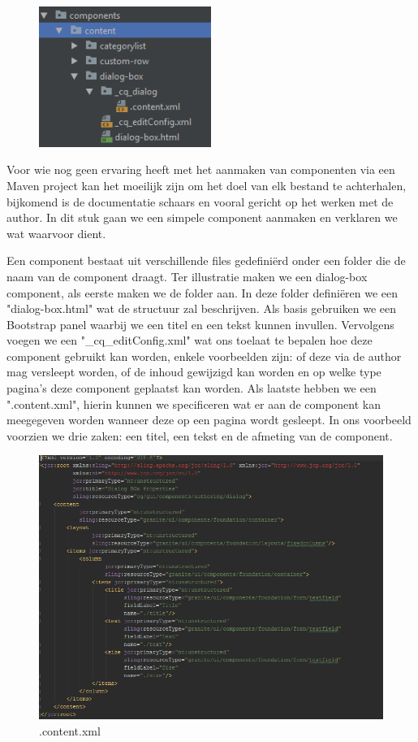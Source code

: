 	\begin{figure}
  		\includegraphics[width=0.5\textwidth]{images/component-pck-structure.PNG}
	\end{figure}
	Voor wie nog geen ervaring heeft met het aanmaken van componenten via een Maven project kan het moeilijk zijn om het doel van elk bestand te achterhalen, bijkomend is de documentatie schaars en vooral gericht op het werken met de author. In dit stuk gaan we een simpele component aanmaken en verklaren we wat waarvoor dient.
	\par
	Een component bestaat uit verschillende files gedefini\"erd onder een folder die de naam van de component draagt. Ter illustratie maken we een dialog-box component, als eerste maken we de folder aan. In deze folder defini\"eren we een "dialog-box.html" wat de structuur zal beschrijven. Als basis gebruiken we een Bootstrap panel waarbij we een titel en een tekst kunnen invullen. Vervolgens voegen we een "\_cq\_editConfig.xml" wat ons toelaat te bepalen hoe deze component gebruikt kan worden, enkele voorbeelden zijn: of deze via de author mag versleept worden, of de inhoud gewijzigd kan worden en op welke type pagina's deze component geplaatst kan worden. Als laatste hebben we een ".content.xml", hierin kunnen we specificeren wat er aan de component kan meegegeven worden wanneer deze op een pagina wordt gesleept. In ons voorbeeld voorzien we drie zaken: een titel, een tekst en de afmeting van de component.
	\begin{figure}[h!]
  		\includegraphics[width=\linewidth]{images/content-xml.PNG}
  		\caption{.content.xml}
  	\end{figure}

